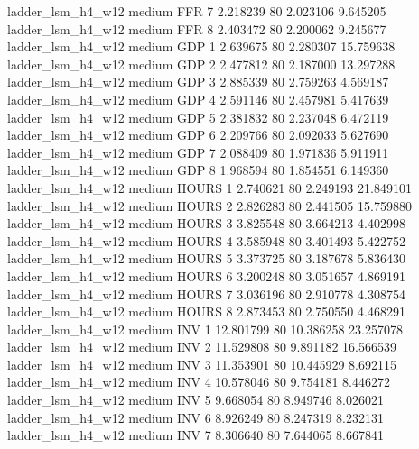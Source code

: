   ladder_lsm_h4_w12     medium      FFR                 7  2.218239 80       2.023106           9.645205
  ladder_lsm_h4_w12     medium      FFR                 8  2.403472 80       2.200062           9.245677
  ladder_lsm_h4_w12     medium      GDP                 1  2.639675 80       2.280307          15.759638
  ladder_lsm_h4_w12     medium      GDP                 2  2.477812 80       2.187000          13.297288
  ladder_lsm_h4_w12     medium      GDP                 3  2.885339 80       2.759263           4.569187
  ladder_lsm_h4_w12     medium      GDP                 4  2.591146 80       2.457981           5.417639
  ladder_lsm_h4_w12     medium      GDP                 5  2.381832 80       2.237048           6.472119
  ladder_lsm_h4_w12     medium      GDP                 6  2.209766 80       2.092033           5.627690
  ladder_lsm_h4_w12     medium      GDP                 7  2.088409 80       1.971836           5.911911
  ladder_lsm_h4_w12     medium      GDP                 8  1.968594 80       1.854551           6.149360
  ladder_lsm_h4_w12     medium    HOURS                 1  2.740621 80       2.249193          21.849101
  ladder_lsm_h4_w12     medium    HOURS                 2  2.826283 80       2.441505          15.759880
  ladder_lsm_h4_w12     medium    HOURS                 3  3.825548 80       3.664213           4.402998
  ladder_lsm_h4_w12     medium    HOURS                 4  3.585948 80       3.401493           5.422752
  ladder_lsm_h4_w12     medium    HOURS                 5  3.373725 80       3.187678           5.836430
  ladder_lsm_h4_w12     medium    HOURS                 6  3.200248 80       3.051657           4.869191
  ladder_lsm_h4_w12     medium    HOURS                 7  3.036196 80       2.910778           4.308754
  ladder_lsm_h4_w12     medium    HOURS                 8  2.873453 80       2.750550           4.468291
  ladder_lsm_h4_w12     medium      INV                 1 12.801799 80      10.386258          23.257078
  ladder_lsm_h4_w12     medium      INV                 2 11.529808 80       9.891182          16.566539
  ladder_lsm_h4_w12     medium      INV                 3 11.353901 80      10.445929           8.692115
  ladder_lsm_h4_w12     medium      INV                 4 10.578046 80       9.754181           8.446272
  ladder_lsm_h4_w12     medium      INV                 5  9.668054 80       8.949746           8.026021
  ladder_lsm_h4_w12     medium      INV                 6  8.926249 80       8.247319           8.232131
  ladder_lsm_h4_w12     medium      INV                 7  8.306640 80       7.644065           8.667841

